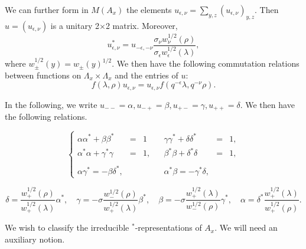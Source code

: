 We can further form in $M(A_x)$ the elements $u_{\epsilon,\nu} = \sum_{y,z} (u_{\epsilon,\nu})_{y,z}$. Then $u=(u_{\epsilon,\nu})$ is a unitary 2$\times$2 matrix. Moreover, \begin{equation}\label{EqAdju}u_{\epsilon,\nu}^* = u_{-\epsilon,-\nu}\frac{ \sigma_{\nu}w_{\nu}^{1/2}(\rho)}{\sigma_{\epsilon}w_{\epsilon}^{1/2}(\lambda)} ,\end{equation} where $w_{\pm}^{1/2}(y) = w_{\pm}(y)^{1/2}$.  We then have the following commutation relations between functions on $\Lambda_x\times \Lambda_x$ and the entries of $u$: \begin{equation}\label{EqGradu} f(\lambda,\rho)u_{\epsilon,\nu} = u_{\epsilon,\nu}f(q^{-\epsilon}\lambda,q^{-\nu}\rho).\end{equation}

In the following, we write $u_{--}=\alpha, u_{-+}= \beta, u_{+-}=\gamma,u_{++}=\delta$. We then have the following relations.


\[\left\{\begin{array}{lllllll} \alpha\alpha^* + \beta\beta^* &=& 1 &&  \gamma\gamma^* + \delta\delta^* &=& 1,\\ \alpha^*\alpha+ \gamma^*\gamma &=&1,&&\beta^*\beta+ \delta^*\delta &=& 1,\\ \\ \alpha \gamma^* = -\beta \delta^*, &&&& \alpha^*\beta = -\gamma^*\delta, \end{array}\right.\]

\[ \delta =  \frac{w_+^{1/2}(\rho)}{w_+^{1/2}(\lambda)}\alpha^*, \quad \gamma=  -\sigma \frac{w_{-}^{1/2}(\rho)}{w_+^{1/2}(\lambda)}\beta^*,\quad  \beta = -\sigma \frac{w_+^{1/2}(\lambda)}{w_{-}^{1/2}(\rho)}\gamma^*, \quad  \alpha = \delta^* \frac{w_+^{1/2}(\lambda)}{w_+^{1/2}(\rho)}.\]


We wish to classify the irreducible $^*$-representations of $A_x$. We will need an auxiliary notion.



